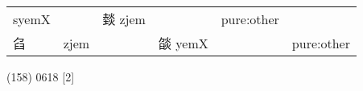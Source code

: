 \documentclass[14pt,a4paper]{scrartcl}
\begin{document}
\begin{longtable}[c]{@{}llllll@{}}
\begin{minipage}[t]{0.14\columnwidth}\raggedright\strut
syemX
\strut\end{minipage} &
\begin{minipage}[t]{0.14\columnwidth}\raggedright\strut
\strut\end{minipage} &
\begin{minipage}[t]{0.14\columnwidth}\raggedright\strut
燅 zjem
\strut\end{minipage} &
\begin{minipage}[t]{0.14\columnwidth}\raggedright\strut
\strut\end{minipage} &
\begin{minipage}[t]{0.14\columnwidth}\raggedright\strut
pure:other
\strut\end{minipage}\tabularnewline
\begin{minipage}[t]{0.14\columnwidth}\raggedright\strut
臽
\strut\end{minipage} &
\begin{minipage}[t]{0.14\columnwidth}\raggedright\strut
zjem
\strut\end{minipage} &
\begin{minipage}[t]{0.14\columnwidth}\raggedright\strut
\strut\end{minipage} &
\begin{minipage}[t]{0.14\columnwidth}\raggedright\strut
燄 yemX
\strut\end{minipage} &
\begin{minipage}[t]{0.14\columnwidth}\raggedright\strut
\strut\end{minipage} &
\begin{minipage}[t]{0.14\columnwidth}\raggedright\strut
pure:other
\strut\end{minipage}\tabularnewline
\bottomrule
\end{longtable}

(158) 0618 {[}2{]}
\end{document}
